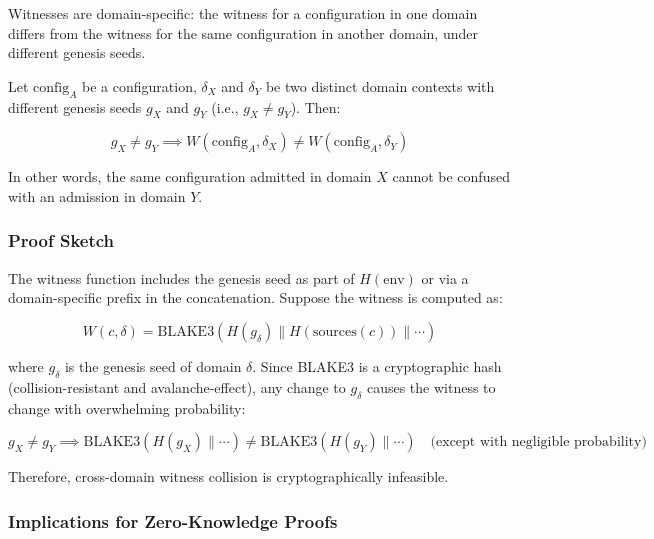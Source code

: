 \documentclass[11pt]{article}
\begin{document}
Witnesses are domain-specific: the witness for a configuration in one domain differs from the witness for the same configuration in another domain, under different genesis seeds.

\begin{theorem}
Let $\text{config}_A$ be a configuration, $\delta_X$ and $\delta_Y$ be two distinct domain contexts with different genesis seeds $g_X$ and $g_Y$ (i.e., $g_X \neq g_Y$). Then:

\begin{equation}
g_X \neq g_Y \implies W(\text{config}_A, \delta_X) \neq W(\text{config}_A, \delta_Y)
\end{equation}

\noindent In other words, the same configuration admitted in domain $X$ cannot be confused with an admission in domain $Y$.
\end{theorem}

\subsubsection{Proof Sketch}

The witness function includes the genesis seed as part of $H(\text{env})$ or via a domain-specific prefix in the concatenation. Suppose the witness is computed as:

\begin{equation}
W(c, \delta) = \text{BLAKE3}(H(g_\delta) \mathbin{\|} H(\text{sources}(c)) \mathbin{\|} \cdots)
\end{equation}

\noindent where $g_\delta$ is the genesis seed of domain $\delta$. Since BLAKE3 is a cryptographic hash (collision-resistant and avalanche-effect), any change to $g_\delta$ causes the witness to change with overwhelming probability:

\begin{equation}
g_X \neq g_Y \implies \text{BLAKE3}(H(g_X) \mathbin{\|} \cdots) \neq \text{BLAKE3}(H(g_Y) \mathbin{\|} \cdots) \quad \text{(except with negligible probability)}
\end{equation}

\noindent Therefore, cross-domain witness collision is cryptographically infeasible.

\subsubsection{Implications for Zero-Knowledge Proofs}
\end{document}

